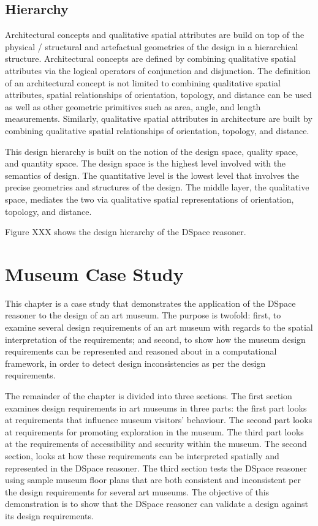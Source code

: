 \documentclass[12pt]{ucthesis}
\begin{document}
\section{Hierarchy}
Architectural concepts and qualitative spatial attributes are build on top of the physical / structural and artefactual geometries of the design in a hierarchical structure. Architectural concepts are defined by combining qualitative spatial attributes via the logical operators of conjunction and disjunction. The definition of an architectural concept is not limited to combining qualitative spatial attributes, spatial relationships of orientation, topology, and distance can be used as well as other geometric primitives such as area, angle, and length measurements. Similarly, qualitative spatial attributes in architecture are built by combining qualitative spatial relationships of orientation, topology, and distance. 

This design hierarchy is built on the notion of the design space, quality space, and quantity space. The design space is the highest level involved with the semantics of design. The quantitative level is the lowest level that involves the precise geometries and structures of the design. The middle layer, the qualitative space, mediates the two via qualitative spatial representations of orientation, topology, and distance.

Figure XXX shows the design hierarchy of the DSpace reasoner.

\chapter{Museum Case Study}
This chapter is a case study that demonstrates the application of the DSpace reasoner to the design of an art museum. The purpose is twofold: first, to examine several design requirements of an art museum with regards to the spatial interpretation of the requirements; and second, to show how the museum design requirements can be represented and reasoned about in a computational framework, in order to detect design inconsistencies as per the design requirements.

The remainder of the chapter is divided into three sections. The first section examines design requirements in art museums in three parts: the first part looks at requirements that influence museum visitors' behaviour. The second part looks at requirements for promoting exploration in the museum. The third part looks at the requirements of accessibility and security within the museum. The second section, looks at how these requirements can be interpreted spatially and represented in the DSpace reasoner. The third section tests the DSpace reasoner using sample museum floor plans that are both consistent and inconsistent per the design requirements for several art museums. The objective of this demonstration is to show that the DSpace reasoner can validate a design against its design requirements.
\end{document}

